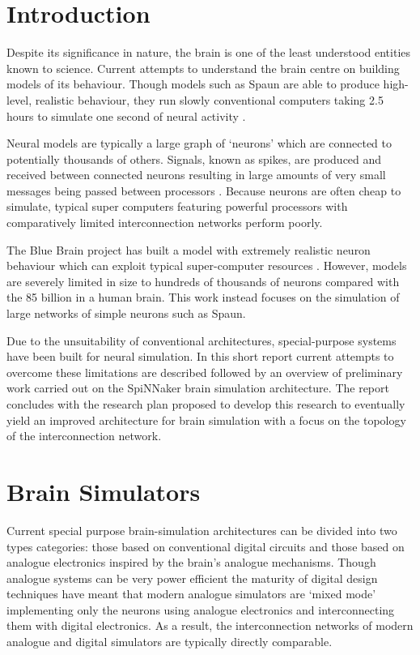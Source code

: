 \section{Introduction}
	
	Despite its significance in nature, the brain is one of the least understood
	entities known to science. Current attempts to understand the brain centre on
	building models of its behaviour. Though models such as Spaun are able to
	produce high-level, realistic behaviour, they run slowly conventional
	computers taking 2.5 hours to simulate one second of neural activity
	\cite{eliasmith12}.
	
	Neural models are typically a large graph of `neurons' which are connected to
	potentially thousands of others. Signals, known as spikes, are produced and
	received between connected neurons resulting in large amounts of very small
	messages being passed between processors \cite{vainbrand11}. Because neurons
	are often cheap to simulate, typical super computers featuring powerful
	processors with comparatively limited interconnection networks perform poorly.
	
	The Blue Brain project has built a model with extremely realistic neuron
	behaviour which can exploit typical super-computer resources \cite{markram06}.
	However, models are severely limited in size to hundreds of thousands of
	neurons compared with the 85 billion in a human brain. This work instead
	focuses on the simulation of large networks of simple neurons such as Spaun.
	
	Due to the unsuitability of conventional architectures, special-purpose
	systems have been built for neural simulation. In this short report current
	attempts to overcome these limitations are described followed by an overview
	of preliminary work carried out on the SpiNNaker brain simulation
	architecture. The report concludes with the research plan proposed to develop
	this research to eventually yield an improved architecture for brain
	simulation with a focus on the topology of the interconnection network.

\section{Brain Simulators}
	
	Current special purpose brain-simulation architectures can be divided into two
	types categories: those based on conventional digital circuits and those based
	on analogue electronics inspired by the brain's analogue mechanisms. Though
	analogue systems can be very power efficient the maturity of digital design
	techniques have meant that modern analogue simulators are `mixed mode'
	implementing only the neurons using analogue electronics and interconnecting
	them with digital electronics. As a result, the interconnection networks of
	modern analogue and digital simulators are typically directly comparable.
	
